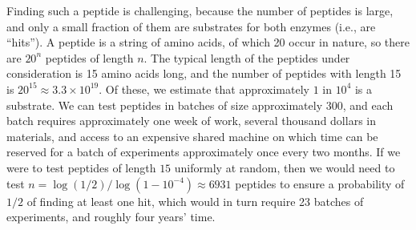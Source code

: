 \documentclass[12pt]{article}
\begin{document}

Finding such a peptide is challenging, because the number of peptides is large, and only a small fraction of them are substrates for both enzymes (i.e., are ``hits'').  A peptide is a string of amino acids, of which 20 occur in nature, so there are $20^n$ peptides of length $n$.  The typical length of the peptides under consideration is 15 amino acids long, and the number of peptides with length 15 is $20^{15} \approx 3.3 \times 10^{19}$.  Of these, we estimate that approximately $1$ in $10^4$ is a substrate. We can test peptides in batches of size approximately $300$, and each batch requires approximately one week of work, several thousand dollars in materials, and access to an expensive shared machine on which time can be reserved for a batch of experiments approximately once every two months. If we were to test peptides of length $15$ uniformly at random, then we would need to test $n = \log(1/2) / \log(1-10^{-4}) \approx 6931$ peptides to ensure a probability of $1/2$ of finding at least one hit, which would in turn require 23 batches of experiments, and roughly four years' time.




\end{document}
